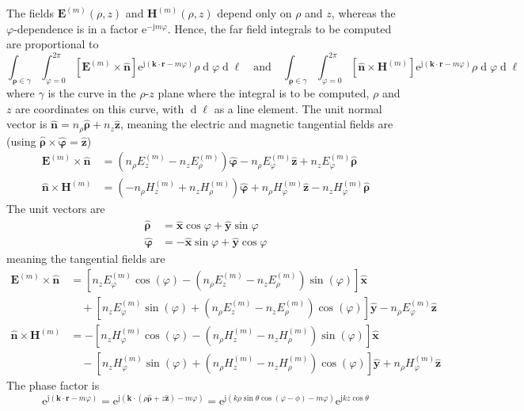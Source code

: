 \documentclass[a4paper,12pt]{article}
\renewcommand{\vec}[1]{\boldsymbol{#1}}
\newcommand{\unitvec}[1]{\hat{\vec{#1}}}
\newcommand{\mrm}[1]{\mathrm{#1}}
\newcommand{\diff}{\operatorname{d}\!}
\newcommand{\ju}{\mrm{j}}
\newcommand{\eu}{\mrm{e}}
\newcommand{\Ev}{\vec{E}}
\newcommand{\Hv}{\vec{H}}
\newcommand{\rv}{\vec{r}}
\newcommand{\kv}{\vec{k}}
\newcommand{\xuv}{\unitvec{x}}
\newcommand{\yuv}{\unitvec{y}}
\newcommand{\zuv}{\unitvec{z}}
\newcommand{\nuv}{\unitvec{n}}
\newcommand{\rhouv}{\unitvec{\rho}}
\newcommand{\varphiuv}{\unitvec{\varphi}}
\begin{document}
The fields $\Ev^{(m)}(\rho,z)$ and $\Hv^{(m)}(\rho,z)$ depend only on
$\rho$ and $z$, whereas the $\varphi$-dependence is in a factor
$\eu^{-\ju m\varphi}$. Hence, the far field integrals to be computed
are proportional to
\begin{equation}
  \int_{\vec{\rho}\in\gamma}\int_{\varphi=0}^{2\pi} [\Ev^{(m)}\times\nuv] \eu^{\ju(\kv\cdot\rv - m\varphi)} \rho\diff\varphi\diff\ell \quad\text{and}\quad \int_{\vec{\rho}\in\gamma} \int_{\varphi=0}^{2\pi} [\nuv\times\Hv^{(m)}] \eu^{\ju(\kv\cdot\rv - m\varphi)} \rho\diff\varphi\diff\ell
\end{equation}
where $\gamma$ is the curve in the $\rho$-$z$ plane where the integral
is to be computed, $\rho$ and $z$ are coordinates on this curve, with
$\diff\ell$ as a line element.  The unit normal vector is
$\nuv = n_{\rho}\rhouv+n_{z}\zuv$, meaning the electric and magnetic
tangential fields are (using $\rhouv\times\varphiuv = \zuv$)
\begin{align}
  \Ev^{(m)}\times\nuv &= (n_{\rho}E_{z}^{(m)} - n_{z}E_{\rho}^{(m)})\varphiuv - n_{\rho}E_{\varphi}^{(m)}\zuv + n_{z}E_{\varphi}^{(m)}\rhouv \\
  \nuv\times\Hv^{(m)} &= (-n_{\rho}H_{z}^{(m)} + n_{z}H_{\rho}^{(m)})\varphiuv + n_{\rho}H_{\varphi}^{(m)}\zuv - n_{z}H_{\varphi}^{(m)}\rhouv
\end{align}
The unit vectors are
\begin{align}
  \rhouv &= \xuv\cos\varphi + \yuv\sin\varphi \\
  \varphiuv &= -\xuv\sin\varphi+\yuv\cos\varphi
\end{align}
meaning the tangential fields are
\begin{align}
  \Ev^{(m)}\times\nuv &= [n_{z}E_{\varphi}^{(m)}\cos(\varphi) -(n_{\rho}E_{z}^{(m)} - n_{z}E_{\rho}^{(m)})\sin(\varphi)]\xuv \\
  &\quad + [n_{z}E_{\varphi}^{(m)}\sin(\varphi) + (n_{\rho}E_{z}^{(m)} - n_{z}E_{\rho}^{(m)})\cos(\varphi)]\yuv - n_{\rho}E_{\varphi}^{(m)}\zuv \\
  \nuv\times\Hv^{(m)} &= - [n_{z}H_{\varphi}^{(m)}\cos(\varphi) - (n_{\rho}H_{z}^{(m)} - n_{z}H_{\rho}^{(m)})\sin(\varphi)]\xuv \\
  &\quad - [n_{z}H_{\varphi}^{(m)}\sin(\varphi) + (n_{\rho}H_{z}^{(m)} - n_{z}H_{\rho}^{(m)})\cos(\varphi)]\yuv + n_{\rho}H_{\varphi}^{(m)}\zuv
\end{align}
The phase factor is
\begin{equation}
  \eu^{\ju(\kv\cdot\rv - m\varphi)} = \eu^{\ju(\kv\cdot(\rho\rhouv+z\zuv) - m\varphi)} = \eu^{\ju(k\rho\sin\theta\cos(\varphi-\phi) - m\varphi)}\eu^{\ju kz\cos\theta}
\end{equation}
\end{document}
